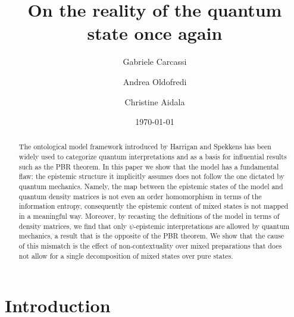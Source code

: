 \documentclass[twocolumn,prl,floatfix,superscriptaddress]{revtex4-2}
\begin{document}
\title{On the reality of the quantum state once again}
\author{Gabriele Carcassi}
\author{Andrea Oldofredi}
\author{Christine Aidala}
\vspace{2mm}

\date{\today}


\begin{abstract}
The ontological model framework introduced by Harrigan and Spekkens has been widely used to categorize quantum interpretations and as a basis for influential results such as the PBR theorem. In this paper we show that the model has a fundamental flaw: the epistemic structure it implicitly assumes does not follow the one dictated by quantum mechanics. Namely, the map between the epistemic states of the model and quantum density matrices is not even an order homomorphism in terms of the information entropy, consequently the epistemic content of mixed states is not mapped in a meaningful way. Moreover, by recasting the definitions of the model in terms of density matrices, we find that only $\psi$-epistemic interpretations are allowed by quantum mechanics, a result that is the opposite of the PBR theorem. We show that the cause of this mismatch is the effect of non-contextuality over mixed preparations that does not allow for a single decomposition of mixed states over pure states.
\end{abstract}

\maketitle

\section{Introduction}
\end{document}
